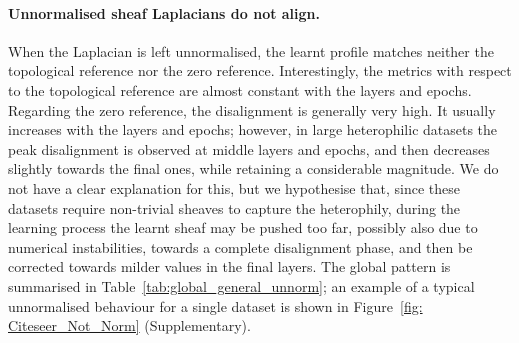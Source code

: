\paragraph{Unnormalised sheaf Laplacians do not align.}
When the Laplacian is left unnormalised, the learnt profile matches neither the
topological reference nor the zero reference.
Interestingly, the metrics with respect to the topological reference are almost constant with the layers and epochs. 
Regarding the zero reference, the disalignment is generally very high.
It usually increases with the layers and epochs; however, in large heterophilic datasets the peak disalignment is observed at middle layers and epochs, and then decreases slightly towards the final ones, while retaining a considerable magnitude.
We do not have a clear explanation for this, but we hypothesise that, since these datasets require non-trivial sheaves to capture the heterophily, during the learning process the learnt sheaf may be pushed too far, possibly also due to numerical instabilities, towards a complete disalignment phase, and then be corrected towards milder values in the final layers.
The global pattern is summarised in Table~\ref{tab:global_general_unnorm}; an example of a typical unnormalised behaviour for a single dataset is shown in Figure~\ref{fig: Citeseer_Not_Norm} (Supplementary).



